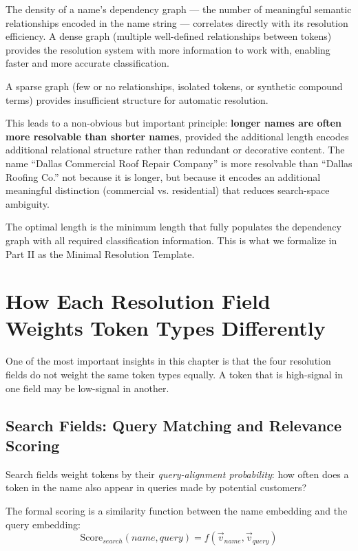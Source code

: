 \documentclass[12pt, openany]{book}
\theoremstyle{thmstyle}
\theoremstyle{defstyle}
\begin{document}
The density of a name's dependency graph --- the number of meaningful semantic relationships encoded in the name string --- correlates directly with its resolution efficiency. A dense graph (multiple well-defined relationships between tokens) provides the resolution system with more information to work with, enabling faster and more accurate classification.

A sparse graph (few or no relationships, isolated tokens, or synthetic compound terms) provides insufficient structure for automatic resolution.

\vspace{8pt}

This leads to a non-obvious but important principle: \textbf{longer names are often more resolvable than shorter names}, provided the additional length encodes additional relational structure rather than redundant or decorative content. The name ``Dallas Commercial Roof Repair Company'' is more resolvable than ``Dallas Roofing Co.'' not because it is longer, but because it encodes an additional meaningful distinction (commercial vs. residential) that reduces search-space ambiguity.

The optimal length is the minimum length that fully populates the dependency graph with all required classification information. This is what we formalize in Part II as the Minimal Resolution Template.

\section{How Each Resolution Field Weights Token Types Differently}

One of the most important insights in this chapter is that the four resolution fields do not weight the same token types equally. A token that is high-signal in one field may be low-signal in another.

\subsection{Search Fields: Query Matching and Relevance Scoring}

Search fields weight tokens by their \textit{query-alignment probability}: how often does a token in the name also appear in queries made by potential customers?

The formal scoring is a similarity function between the name embedding and the query embedding:
\[
\text{Score}_{search}(name, query) = f(\vec{v}_{name}, \vec{v}_{query})
\]
\end{document}
